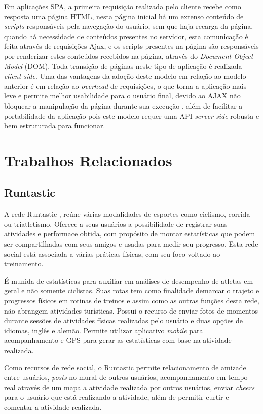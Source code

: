 Em aplicações SPA, a primeira requisição realizada pelo cliente recebe como resposta uma página HTML, nesta página inicial há um extenso conteúdo de
\textit{scripts} responsáveis pela navegação do usuário, sem que haja recarga da página, quando há necessidade de conteúdos presentes no servidor, 
esta comunicação é feita através de requisições Ajax, e os scripts presentes na página são responsáveis por renderizar estes conteúdos recebidos na
página, através do \textit{Document Object Model} (DOM). Toda transição de páginas neste tipo de aplicação é realizada \textit{client-side}. 
Uma das vantagens da adoção deste modelo em relação ao modelo anterior é em relação ao \textit{overhead} de requisições, o que torna a aplicação 
mais leve e permite melhor usabilidade para o usuário final, devido ao AJAX não bloquear a manipulação da página durante sua execução \cite{spa01}, 
além de facilitar a portabilidade da aplicação pois este modelo requer uma API \textit{server-side} robusta e bem estruturada para funcionar.

\section{\esp Trabalhos Relacionados}
\subsection{Runtastic}
A rede Runtastic \cite{runtastic}, reúne várias modalidades de esportes como ciclismo, corrida ou triatletismo. Oferece a seus usuários a
possibilidade de registrar suas atividades e performace obtida, com propósito de montar estatísticas que podem ser compartilhadas com seus amigos e
usadas para medir seu progresso. Esta rede social está associada a várias práticas físicas, com seu foco voltado ao treinamento. 

É munida de estatísticas para auxiliar em análises de desempenho de atletas em geral e não somente ciclistas. Suas rotas tem como finalidade 
demarcar o trajeto e progressos físicos em rotinas de treinos e assim como as outras funções desta rede, não abrangem atividades turísticas. Possui o 
recurso de enviar fotos de momentos durante sessões de atividades físicas realizadas pelo usuário e duas opções de idiomas, inglês e alemão. Permite 
utilizar aplicativo \textit{mobile} para acompanhamento e GPS para gerar as estatísticas com base na atividade realizada. 

Como recursos de rede social, o Runtastic permite relacionamento de amizade entre usuários, \textit{posts} no mural de outros usuários, 
acompanhamento em tempo real através de um mapa a  atividade realizada por outros usuários, enviar \textit{cheers} para o usuário que está 
realizando a atividade, além de permitir curtir e comentar a atividade realizada. 

